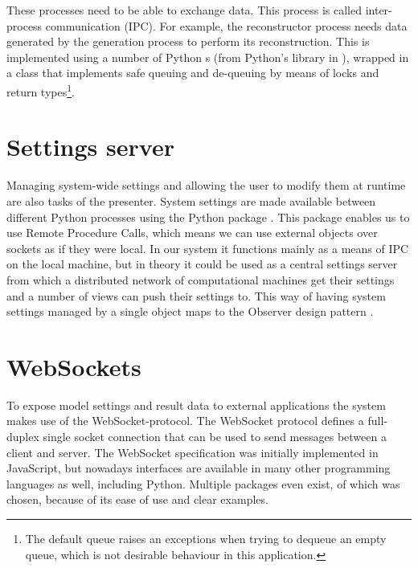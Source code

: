 \documentclass[a4paper, openany, oneside]{memoir}
\begin{document}
These processes need to be able to exchange data. This process is called inter-process communication (IPC). For example, the reconstructor process needs data generated by the generation process to perform its reconstruction. This is implemented using a number of Python s (from Python's  library in \cite{pythonref}), wrapped in a class that implements safe queuing and de-queuing by means of locks and  return types\footnote{The default queue raises an exceptions when trying to dequeue an empty queue, which is not desirable behaviour in this application.}.

\section{Settings server}
\label{sec:settings_server}
Managing system-wide settings and allowing the user to modify them at runtime are also tasks of the presenter. System settings are made available between different Python processes using the Python package . This package enables us to use Remote Procedure Calls, which means we can use external objects over sockets as if they were local. In our system it functions mainly as a means of IPC on the local machine, but in theory it could be used as a central settings server from which a distributed network of computational machines get their settings and a number of views can push their settings to. This way of having system settings managed by a single object maps to the Observer design pattern \cite{msdn-observer}.

\section{WebSockets}
\label{sec:websockets}
To expose model settings and result data to external applications the system makes use of the WebSocket-protocol. The WebSocket protocol defines a full-duplex single socket connection that can be used to send messages between a client and server. The WebSocket specification was initially implemented in JavaScript, but nowadays interfaces are available in many other programming languages as well, including Python. Multiple packages even exist, of which  was chosen, because of its ease of use and clear examples.
\end{document}
